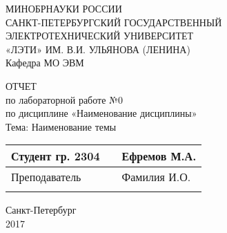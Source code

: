 \clearpage
\begin{center}	
	МИНОБРНАУКИ РОССИИ\\
	САНКТ-ПЕТЕРБУРГСКИЙ ГОСУДАРСТВЕННЫЙ\\
	ЭЛЕКТРОТЕХНИЧЕСКИЙ УНИВЕРСИТЕТ\\
	«ЛЭТИ» ИМ. В.И. УЛЬЯНОВА (ЛЕНИНА)\\
	Кафедра МО ЭВМ

	\vspace{54mm}

	ОТЧЕТ\\
	по лабораторной работе №0 \\
	по дисциплине «Наименование дисциплины» \\
	Тема: Наименование темы \\

	\vspace{65mm}

	\def\arraystretch{1.5}
	\begin{tabularx}{\textwidth}{ >{\hsize=7cm}X >{\hsize=4cm}X  >{\centering\arraybackslash}X }
		Студент гр. 2304 & & Ефремов М.А. \\ \cline{2-2}
		Преподаватель & & Фамилия И.О. \\ \cline{2-2}
	\end{tabularx}
	\def\arraystretch{1}

	\vfill
	Санкт-Петербург\\
	2017
\end{center}
\newpage
{}
\setcounter{page}{2}